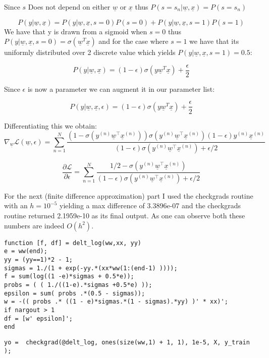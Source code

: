 \documentclass[11pt]{article}
\begin{document}
 Since  $s$ Does not depend on either $\underline{w}$ or $\underline{x}$ thus $P( s= s_{n}|\underline{w}, \underline{x})  = P( s= s_{n}) $

\[
P(y| \underline{w}, \underline{x}) = P(y | \underline{w}, \underline{x},s = 0)P(s = 0)  + P(y | \underline{w}, \underline{x},s = 1)P(s = 1)
\]
\newline
 We have that y is drawn from a sigmoid when  $s=0$
 thus $P(y | \underline{w}, \underline{x},s = 0) = \sigma( \underline{w}^{T} \underline{x})$  and for the case where $s=1$ we have that its uniformly distributed over 2 discrete value which yields $P(y | \underline{w}, \underline{x},s = 1) = 0.5$:
 
 
 \[
P(y| \underline{w}, \underline{x}) = ( 1 - \epsilon)\sigma( y\underline{w}^{T} \underline{x})  + \frac{\epsilon}{2}
\]

Since $\epsilon$ is now a parameter we can augment it in our parameter list: 
 
 \[
P(y| \underline{w}, \underline{x}, \epsilon) = ( 1 - \epsilon)\sigma(y \underline{w}^{T} \underline{x})  + \frac{\epsilon}{2}
\]

Differentiating this we obtain:
$$\nabla_{\underline{w}} \mathcal{L}(\underline{w},\epsilon) = \sum_{n=1}^{N}\frac{(1 - \sigma(y^{(n)} \underline{w}^\top \underline{x}^{(n)})) \sigma(y^{(n)} \underline{w}^\top \underline{x}^{(n)}) (1 - \epsilon) y^{(n)}  \underline{x}^{(n)}}{(1 - \epsilon) \sigma(y^{(n)} \underline{w}^\top \underline{x}^{(n)}) + \epsilon/2}$$

$$ \frac{\partial \mathcal{L}}{\partial \epsilon} = \sum_{n=1}^{N} \frac{1/2 - \sigma(y^{(n)} \underline{w}^\top \underline{x}^{(n)})}{(1 - \epsilon) \sigma(y^{(n)} \underline{w}^\top \underline{x}^{(n)}) + \epsilon/2}$$


For the next (finite difference approximation) part I used the checkgrads routine with an $h=10^{-5}$ yielding a max difference of 3.3896e-07 and the checkgrads routine returned 2.1959e-10 as its final output. As one can observe both these numbers are indeed $O(h^{2})$.
\begin{lstlisting}
function [f, df] = delt_log(ww,xx, yy)
e = ww(end);
yy = (yy==1)*2 - 1;
sigmas = 1./(1 + exp(-yy.*(xx*ww(1:(end-1) ))));
f = sum(log((1 -e)*sigmas + 0.5*e));
probs = ( ( 1./((1-e).*sigmas +0.5*e) ));
epsilon = sum( probs .*(0.5 - sigmas));
w = -(( probs .* ((1 - e)*sigmas.*(1 - sigmas).*yy) )' * xx)';
if nargout > 1
df = [w' epsilon]';
end

\end{lstlisting}
\begin{lstlisting}
yo =  checkgrad(@delt_log, ones(size(ww,1) + 1, 1), 1e-5, X, y_train );
\end{lstlisting}
\end{document}
